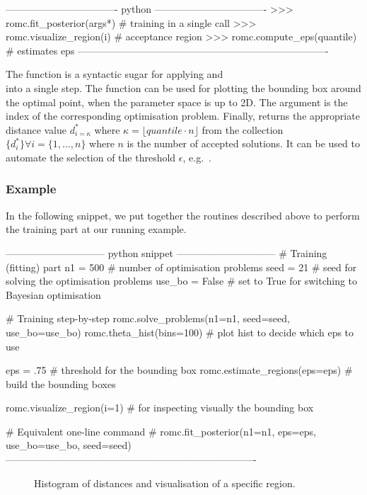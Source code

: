 \begin{Code}
---------------------------------- python ----------------------------------
>>> romc.fit_posterior(args*)  # training in a single call
>>> romc.visualize_region(i)   # acceptance region
>>> romc.compute_eps(quantile) # estimates eps
----------------------------------------------------------------------------
\end{Code}

\noindent
The function  is a syntactic sugar for applying
 and \\  into a single
step. The function  can be used for plotting
the bounding box around the optimal point, when the parameter space is
up to 2D. The argument  is the index of the corresponding
optimisation problem. Finally,  returns the
appropriate distance value \(d_{i=\kappa}^*\) where
\(\kappa = \lfloor quantile \cdot n \rfloor\) from the collection
\(\{ d_i^* \} \forall i = \{1, \ldots, n\}\) where \(n\) is the number
of accepted solutions. It can be used to automate the selection of the
threshold \(\epsilon\), e.g.\
.


\subsubsection*{Example}


In the following snippet, we put together the routines described above
to perform the training part at our running example.

\begin{Code}
------------------------------ python snippet ------------------------------
  # Training (fitting) part
  n1 = 500 # number of optimisation problems
  seed = 21 # seed for solving the optimisation problems
  use_bo = False # set to True for switching to Bayesian optimisation

  # Training step-by-step
  romc.solve_problems(n1=n1, seed=seed, use_bo=use_bo)
  romc.theta_hist(bins=100) # plot hist to decide which eps to use

  eps = .75 # threshold for the bounding box 
  romc.estimate_regions(eps=eps) # build the bounding boxes

  romc.visualize_region(i=1) # for inspecting visually the bounding box

  # Equivalent one-line command
  # romc.fit_posterior(n1=n1, eps=eps, use_bo=use_bo, seed=seed)
----------------------------------------------------------------------------  
\end{Code}

\begin{figure}[ht]
  \begin{center}    
    
    
  \end{center}
  \caption[Histogram of distances at the one-dimensional example.]{Histogram of
    distances and visualisation of a specific region.}
  \label{fig:running_example_romc_inference}
\end{figure}
